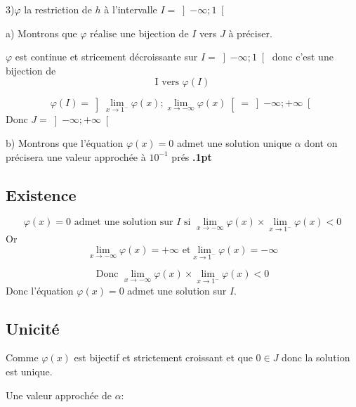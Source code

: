 \documentclass[12pt]{article}
\begin{document}
3)$\varphi$ la restriction de $h$ à l’intervalle $I=\left]-\infty; 1 \right[ $
   
    a) Montrons que $\varphi$  réalise une bijection de $I$ vers $J$  à préciser.
    
$\varphi$ est continue et stricement décroissante sur $I=\left]-\infty; 1 \right[  $ donc c'est une bijection de \[\text{I vers } \varphi(I)\]

\[\varphi(I)=\left] \lim_{x \to 1^{-}}\varphi(x); \lim_{x \to -\infty}\varphi(x) \right[=\left]-\infty; +\infty\right[\]
    Donc $J=\left]-\infty; +\infty\right[$
    
b) Montrons que l’équation $\varphi(x)=0$ admet une solution unique $\alpha$ dont on précisera une valeur approchée à $10^{-1}$ prés \textbf{.1pt}
\subsection*{Existence}
\[\varphi(x)=0 \text{ admet une solution sur $I$ si } \lim_{x \to -\infty}\varphi(x)\times\lim_{x \to 1^{-}}\varphi(x)<0\]
Or
\[\lim_{x \to -\infty}\varphi(x)=+\infty \text{ et} \lim_{x \to 1^{-}}\varphi(x)=-\infty\]

\[\text{Donc } \lim_{x \to -\infty}\varphi(x)\times\lim_{x \to 1^{-}}\varphi(x)<0\]
Donc l'équation $\varphi(x)=0$ admet une solution sur $I$.
\subsection*{Unicité}
Comme $\varphi(x)$ est bijectif et strictement croissant et que $0\in J$ donc la solution est unique. 

Une valeur approchée de $\alpha$:
\end{document}
